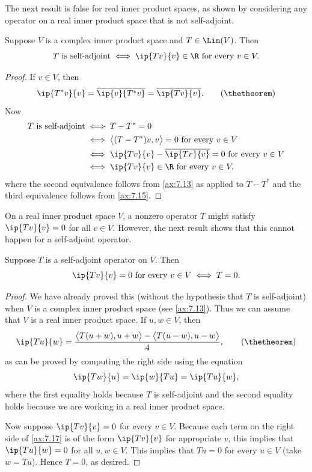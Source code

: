 %
The next result is false for real inner product spaces, as shown by considering
any operator on a real inner product space that is not self-adjoint.

\begin{result}[$\ip{Tv}{v}$ is real for all $v$ $\iff$ $T$ is self-adjoint
(assuming $\F=\C$)]\label{ax:7.14}
Suppose $V$ is a complex inner product space and $T\in\Lin(V)$. Then
\[ T \text{ is self-adjoint} \iff \ip{Tv}{v}\in\R \text{ for every } v\in V. \]
\end{result}

\begin{proof}
If $v\in V$, then
\[ \ip{T^*v}{v} = \overline{\ip{v}{T^*v}} = \overline{\ip{Tv}{v}}.
   \tag{\thetheorem} \]
Now
\begin{align*}
T \text{ is self-adjoint} &\iff T-T^*=0\\
  &\iff \bigl\langle (T-T^*)v,v\bigr\rangle=0 \text{ for every } v\in V\\
  &\iff \ip{Tv}{v}-\overline{\ip{Tv}{v}}=0 \text{ for every } v\in V\\
  &\iff \ip{Tv}{v}\in\R \text{ for every } v\in V,
\end{align*}
where the second equivalence follows from \ref{ax:7.13} as applied to $T-T^*$
and the third equivalence follows from \ref{ax:7.15}.
\end{proof}

On a real inner product space $V$, a nonzero operator $T$ might satisfy
$\ip{Tv}{v}=0$ for all $v\in V$. However, the next result shows that this
cannot happen for a self-adjoint operator.

\begin{result}[$T$ self-adjoint and $\ip{Tv}{v}=0$ for all $v$ $\iff$
$T=0$]\label{ax:7.16}
Suppose $T$ is a self-adjoint operator on $V$. Then
\[ \ip{Tv}{v}=0 \text{ for every } v\in V \iff T=0. \]
\end{result}

\begin{proof}
We have already proved this (without the hypothesis that $T$ is self-adjoint)
when $V$ is a complex inner product space (see \ref{ax:7.13}). Thus we can
assume that $V$ is a real inner product space. If $u,w\in V$, then%
\[ \ip{Tu}{w} = \frac{\bigl\langle T(u+w),u+w\bigr\rangle
                      -\bigl\langle T(u-w),u-w\bigr\rangle}{4},
   \tag{\thetheorem} \]
as can be proved by computing the right side using the equation
\[ \ip{Tw}{u} = \ip{w}{Tu} = \ip{Tu}{w}, \]
where the first equality holds because $T$ is self-adjoint and the second
equality holds because we are working in a real inner product space.

Now suppose $\ip{Tv}{v}=0$ for every $v\in V$. Because each term on the right
side of \ref{ax:7.17} is of the form $\ip{Tv}{v}$ for appropriate $v$, this
implies that $\ip{Tu}{w}=0$ for all $u,w\in V$. This implies that $Tu=0$ for
every $u\in V$ (take $w=Tu$). Hence $T=0$, as desired.
\end{proof}

